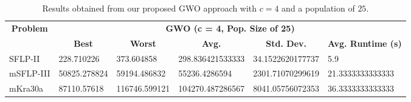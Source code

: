 \begin{table}[h!]
\begin{adjustwidth}{-1.18in}{}
	\centering
	\begin{tabular}{|l|l|l|l|l|l|}
	\hline
	\multicolumn{1}{|c|}{\multirow{2}{*}{\textbf{Problem}}} & \multicolumn{5}{c|}{\textbf{GWO (c = 4, Pop. Size of 25)}} \\ \cline{2-6} 
	\multicolumn{1}{|c|}{}                                  & \multicolumn{1}{c|}{\textbf{Best}} & \multicolumn{1}{c|}{\textbf{Worst}} & \multicolumn{1}{c|}{\textbf{Avg.}} & \multicolumn{1}{c|}{\textbf{Std. Dev.}} & \multicolumn{1}{c|}{\textbf{Avg. Runtime (s)}} \\ \hline
	SFLP-II                                                 & 228.710226                                  & 373.604858                                   & 298.836421533333                      & 34.1522620177737                                 & 5.9                                  \\ \hline
	mSFLP-III                                               & 50825.278824                                & 59194.486832                                 & 55236.4286594						         & 2301.71070299619                              & 21.3333333333333                               \\ \hline
	mKra30a                                               & 87110.57618                                & 116746.599121                                 &
	104270.487286567							&
	8041.05756072353							&
	36.3333333333333						\\ \hline
	\end{tabular}
\end{adjustwidth}
\caption{Results obtained from our proposed GWO approach with $c = 4$ and a population of $25$.}
\label{approach-gwo-c4-p25-results}
\end{table}

